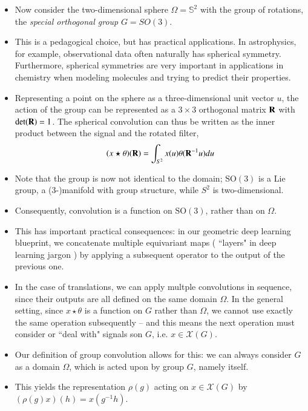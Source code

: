 \documentclass[12pt]{article}
\numberwithin{equation}{section}
\theoremstyle{definition}
\newcommand{		\B		}	{\textbf					} %
\newcommand{		\1		}	{	\bm{1}					}%
\newcommand{		\matR	}	{	\B{\rm \B{R}}				}
\begin{document}
\begin{itemize}
\item Now consider the two-dimensional sphere $\Omega = \mathbb{S}^2$ with the group of rotations, the \emph{special orthogonal group} $G = SO(3)$. 

\item This is a pedagogical choice, but has practical applications. In astrophysics, for example, observational data often naturally has spherical symmetry. Furthermore, spherical symmetries are very important in applications in chemistry when modeling molecules and trying to predict their properties.

\item  Representing a point on the sphere as a three-dimensional unit vector $u$, the action of the group can be represented as a $3 \times 3$ orthogonal matrix $\matR$ with $\det(\matR) = 1$. The spherical convolution can thus be written as the inner product between the signal and the rotated filter,
$$
(x \star \theta ) (\matR)  = \int_{S^2} x(u) \theta(\matR^{-1} u) du
$$

\item Note that the group is now not identical to the domain; $\text{SO}(3)$ is a Lie group, a ($3$-)manifold with group structure, while $S^2$ is two-dimensional.  

\item Consequently, convolution is a function on $\text{SO}(3)$, rather than on $\Omega$. 

\item This has important practical consequences: in our geometric deep learning blueprint, we concatenate multiple equivariant maps ( ``layers" in deep learning jargon ) by applying a subsequent operator to the output of the previous one. 

\item In the case of translations, we can apply multple convolutions in sequence, since their outputs are all defined on the same domain $\Omega$. In the general setting, since $x \star \theta$ is a function on $G$ rather than $\Omega$, we cannot use exactly the same operation subsequently -- and this means the next operation must consider or ``deal with" signals son $G$, i.e. $x \in \mathcal{X}(G)$. 

\item Our definition of group convolution allows for this: we can always consider $G$ as a domain $\Omega$, which is acted upon by group $G$, namely itself. 

\item This yields the representation $\rho(g)$ acting on $x \in \mathcal{X}(G)$ by $(\rho(g) x ) (h) = x(g^{-1}h )$. 


\end{itemize}
\end{document}
